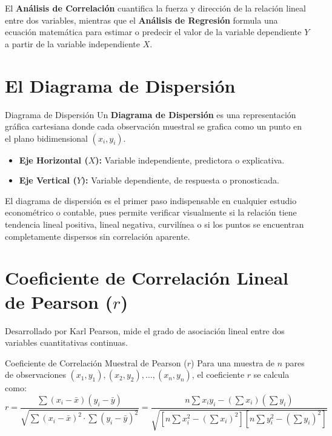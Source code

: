 El \textbf{Análisis de Correlación} cuantifica la fuerza y dirección de la relación lineal entre dos variables, mientras que el \textbf{Análisis de Regresión} formula una ecuación matemática para estimar o predecir el valor de la variable dependiente $Y$ a partir de la variable independiente $X$.

\section{El Diagrama de Dispersión}

\begin{definicion}{Diagrama de Dispersión}
Un \textbf{Diagrama de Dispersión} es una representación gráfica cartesiana donde cada observación muestral se grafica como un punto en el plano bidimensional $(x_i, y_i)$.
\begin{itemize}
    \item \textbf{Eje Horizontal ($X$):} Variable independiente, predictora o explicativa.
    \item \textbf{Eje Vertical ($Y$):} Variable dependiente, de respuesta o pronosticada.
\end{itemize}
\end{definicion}

El diagrama de dispersión es el primer paso indispensable en cualquier estudio econométrico o contable, pues permite verificar visualmente si la relación tiene tendencia lineal positiva, lineal negativa, curvilínea o si los puntos se encuentran completamente dispersos sin correlación aparente.

\section{Coeficiente de Correlación Lineal de Pearson ($r$)}
Desarrollado por Karl Pearson, mide el grado de asociación lineal entre dos variables cuantitativas continuas.

\begin{definicion}{Coeficiente de Correlación Muestral de Pearson ($r$)}
Para una muestra de $n$ pares de observaciones $(x_1, y_1), (x_2, y_2), \dots, (x_n, y_n)$, el coeficiente $r$ se calcula como:
\begin{equation}
    r = \frac{\sum (x_i - \bar{x})(y_i - \bar{y})}{\sqrt{\sum (x_i - \bar{x})^2 \cdot \sum (y_i - \bar{y})^2}} = \frac{n \sum x_i y_i - (\sum x_i)(\sum y_i)}{\sqrt{\left[ n \sum x_i^2 - (\sum x_i)^2 \right] \left[ n \sum y_i^2 - (\sum y_i)^2 \right]}}
\end{equation}
\end{definicion}

